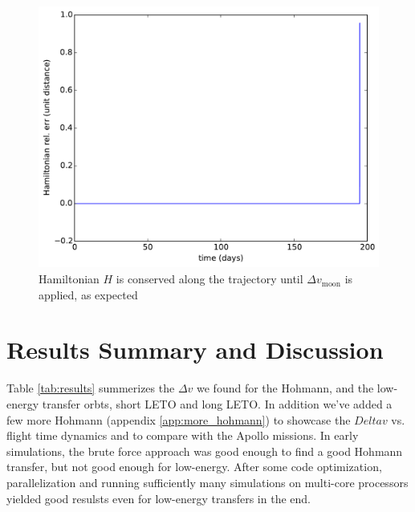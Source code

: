 \begin{figure}[ht!]
\centering
\includegraphics[scale=0.35]{fig/low-energy-long/H_low_energy_long.pdf}
\caption{Hamiltonian $H$ is conserved along the trajectory until $\Delta v_{\text{moon}}$ is applied, as expected}
\label{fig:low_energy_long-H}
\end{figure}


\section{Results Summary and Discussion}
Table \ref{tab:results} summerizes the $\Delta v$ we found for the Hohmann, and the low-energy transfer orbts, short LETO and long LETO. In addition we've added a few more Hohmann (appendix \ref{app:more_hohmann}) to showcase the $Delta v$ vs. flight time dynamics and to compare with the Apollo missions. In early simulations, the brute force approach was good enough to find a good Hohmann transfer, but not good enough for low-energy. After some code optimization, parallelization and running sufficiently many simulations on multi-core processors yielded good resulsts even for low-energy transfers in the end.

